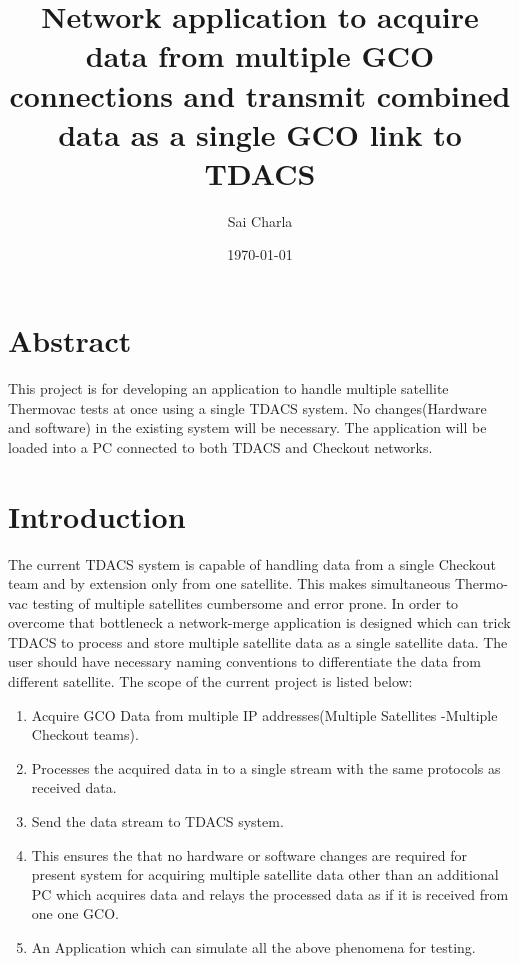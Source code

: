 \documentclass[12pt, a4paper]{report}
\title{Network application to acquire data from multiple GCO connections and
	   transmit combined data as a single GCO link to TDACS}
\author{Sai Charla}
\date{\today}
\begin{document}
\maketitle
\tableofcontents


\chapter*{Abstract}
\par This project is for developing an application to handle multiple satellite
Thermovac tests at once using a single TDACS system. No changes(Hardware and
software) in the existing system will be necessary. The application will be
loaded into a PC connected to both TDACS and Checkout networks.


\chapter{Introduction}

\par The current TDACS system is capable of handling data from a single
Checkout team and by extension only from one satellite. This makes simultaneous
Thermo-vac testing of multiple satellites cumbersome and error prone. In order
to overcome that bottleneck a network-merge application is designed which can
trick TDACS to process and store multiple satellite data as a single satellite
data. The user should have necessary naming conventions to differentiate the
data from different satellite. The scope of the current project is listed below:

	\begin{enumerate}
			\item Acquire GCO Data from multiple IP addresses(Multiple Satellites
					-Multiple Checkout teams).
			\item Processes the acquired data in to a single stream with the same
					protocols as received data.
			\item Send the data stream to TDACS system.
			\item This ensures the that no hardware or software changes are required
					for present system for acquiring multiple satellite data other than an
					additional PC which acquires data and relays the processed data as if it
					is received from one one GCO.
			\item An Application which can simulate all the above phenomena for
					testing.
	\end{enumerate}
\end{document}
